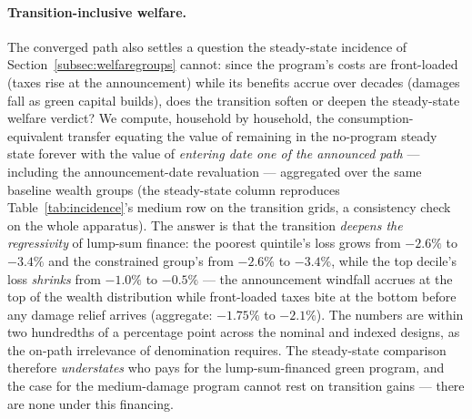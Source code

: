 \documentclass[12pt]{article}
\begin{document}
\paragraph{Transition-inclusive welfare.} The converged path also settles
a question the steady-state incidence of Section~\ref{subsec:welfaregroups}
cannot: since the program's costs are front-loaded (taxes rise at the
announcement) while its benefits accrue over decades (damages fall as
green capital builds), does the transition soften or deepen the
steady-state welfare verdict? We compute, household by household, the
consumption-equivalent transfer equating the value of remaining in the
no-program steady state forever with the value of \emph{entering date one
of the announced path} --- including the announcement-date revaluation ---
aggregated over the same baseline wealth groups (the steady-state column
reproduces Table~\ref{tab:incidence}'s medium row on the transition grids,
a consistency check on the whole apparatus). The answer is that the
transition \emph{deepens the regressivity} of lump-sum finance: the poorest
quintile's loss grows from $-2.6\%$ to $-3.4\%$ and the constrained
group's from $-2.6\%$ to $-3.4\%$, while the top decile's loss
\emph{shrinks} from $-1.0\%$ to $-0.5\%$ --- the announcement windfall
accrues at the top of the wealth distribution while front-loaded taxes
bite at the bottom before any damage relief arrives (aggregate:
$-1.75\%$ to $-2.1\%$). The numbers are within two hundredths of a
percentage point across the nominal and indexed designs, as the on-path
irrelevance of denomination requires. The steady-state comparison
therefore \emph{understates} who pays for the lump-sum-financed green
program, and the case for the medium-damage program cannot rest on
transition gains --- there are none under this financing.
\end{document}
